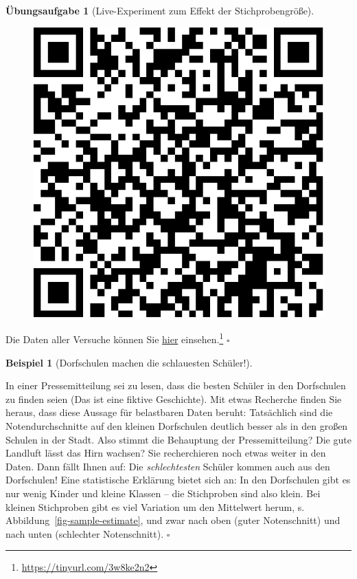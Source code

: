 \documentclass[
  letterpaper,
]{scrbook}
\theoremstyle{definition}
\newtheorem{exercise}{Übungsaufgabe}[chapter]
\theoremstyle{definition}
\newtheorem{example}{Beispiel}[chapter]
\theoremstyle{definition}
\theoremstyle{remark}
\begin{document}
\begin{exercise}[Live-Experiment zum Effekt der
Stichprobengröße]
\begin{figure}
\begin{minipage}{0.20\linewidth}
\begin{center}
\includegraphics[width=0.75\linewidth,height=\textheight,keepaspectratio]{010-rahmen_files/figure-pdf/unnamed-chunk-16-1.pdf}
\end{center}

\end{minipage}%

\end{figure}%

Die Daten aller Versuche können Sie
\href{https://docs.google.com/spreadsheets/d/11mKFFpr-Y1CMPpq4dGA-JA_Z9jRkPbXolo54Y0G_2gE/edit?usp=sharing}{hier}
einsehen.\footnote{\url{https://tinyurl.com/3w8ke2n2}} \(\square\)

\end{exercise}

\begin{example}[Dorfschulen machen die schlauesten
Schüler!]\protect\hypertarget{exm-schule-samplesize}{}\label{exm-schule-samplesize}

In einer Pressemitteilung sei zu lesen, dass die besten Schüler in den
Dorfschulen zu finden seien (Das ist eine fiktive Geschichte). Mit etwas
Recherche finden Sie heraus, dass diese Aussage für belastbaren Daten
beruht: Tatsächlich sind die Notendurchschnitte auf den kleinen
Dorfschulen deutlich besser als in den großen Schulen in der Stadt. Also
stimmt die Behauptung der Pressemitteilung? Die gute Landluft lässt das
Hirn wachsen? Sie recherchieren noch etwas weiter in den Daten. Dann
fällt Ihnen auf: Die \emph{schlechtesten} Schüler kommen auch aus den
Dorfschulen! Eine statistische Erklärung bietet sich an: In den
Dorfschulen gibt es nur wenig Kinder und kleine Klassen -- die
Stichproben sind also klein. Bei kleinen Stichproben gibt es viel
Variation um den Mittelwert herum, s.
Abbildung~\ref{fig-sample-estimate}, und zwar nach oben (guter
Notenschnitt) und nach unten (schlechter Notenschnitt). \(\square\)

\end{example}
\end{document}
